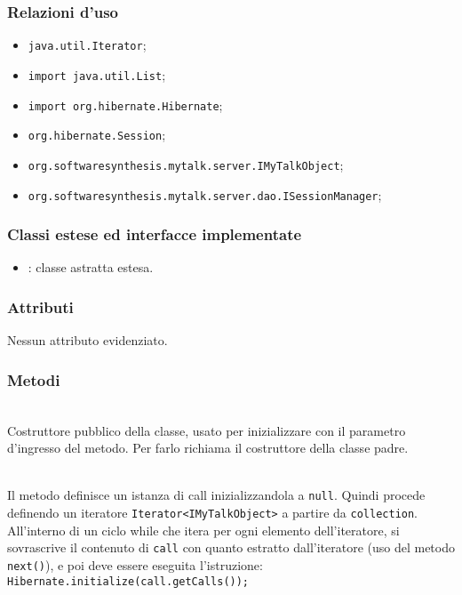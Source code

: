 \subsubsection*{Relazioni d'uso}

\begin{itemize}
		\item \texttt{java.util.Iterator};
		\item \texttt{import java.util.List};
		\item \texttt{import org.hibernate.Hibernate};
		\item \texttt{org.hibernate.Session};
		\item \texttt{org.softwaresynthesis.mytalk.server.IMyTalkObject};
		\item \texttt{org.softwaresynthesis.mytalk.server.dao.ISessionManager};
\end{itemize}

\subsubsection*{Classi estese ed interfacce implementate}

\begin{itemize}
	\item {}: classe astratta estesa.
\end{itemize}

\subsubsection*{Attributi}

Nessun attributo evidenziato.

\subsubsection*{Metodi}

\begin{description}
	\item{}\\
	Costruttore pubblico della classe, usato per inizializzare  con il parametro d'ingresso del metodo. Per farlo richiama il costruttore della classe padre.

	\item{}\\
	Il metodo definisce un istanza di  call inizializzandola a \texttt{null}. Quindi procede definendo un iteratore \texttt{Iterator<IMyTalkObject>} a partire da \texttt{collection}. All'interno di un ciclo while che itera per ogni elemento dell'iteratore, si sovrascrive il contenuto di \texttt{call} con quanto estratto dall'iteratore (uso del metodo \texttt{next()}), e poi deve essere eseguita l'istruzione:\\
	
	\verb|Hibernate.initialize(call.getCalls());|

\end{description}

